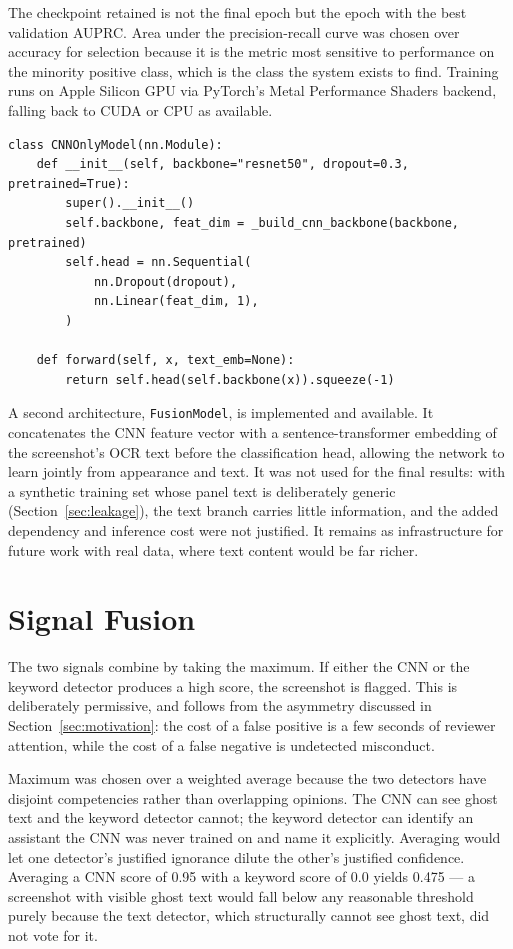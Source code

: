 \documentclass[12pt,oneside]{report}
\newcommand{\code}[1]{\texttt{\small #1}}
\begin{document}
The checkpoint retained is not the final epoch but the epoch with the best
validation AUPRC. Area under the precision-recall curve was chosen over
accuracy for selection because it is the metric most sensitive to performance
on the minority positive class, which is the class the system exists to find.
Training runs on Apple Silicon GPU via PyTorch's Metal Performance Shaders
backend, falling back to CUDA or CPU as available.

\begin{lstlisting}[caption={Model construction. \code{use\_ocr} selects between the CNN-only and fusion architectures.}]
class CNNOnlyModel(nn.Module):
    def __init__(self, backbone="resnet50", dropout=0.3, pretrained=True):
        super().__init__()
        self.backbone, feat_dim = _build_cnn_backbone(backbone, pretrained)
        self.head = nn.Sequential(
            nn.Dropout(dropout),
            nn.Linear(feat_dim, 1),
        )

    def forward(self, x, text_emb=None):
        return self.head(self.backbone(x)).squeeze(-1)
\end{lstlisting}

A second architecture, \code{FusionModel}, is implemented and available. It
concatenates the CNN feature vector with a sentence-transformer embedding of
the screenshot's OCR text before the classification head, allowing the network
to learn jointly from appearance and text. It was not used for the final
results: with a synthetic training set whose panel text is deliberately generic
(Section~\ref{sec:leakage}), the text branch carries little information, and the
added dependency and inference cost were not justified. It remains as
infrastructure for future work with real data, where text content would be far
richer.

\section{Signal Fusion}
\label{sec:fusion}

The two signals combine by taking the maximum. If either the CNN or the keyword
detector produces a high score, the screenshot is flagged. This is deliberately
permissive, and follows from the asymmetry discussed in
Section~\ref{sec:motivation}: the cost of a false positive is a few seconds of
reviewer attention, while the cost of a false negative is undetected
misconduct.

Maximum was chosen over a weighted average because the two detectors have
disjoint competencies rather than overlapping opinions. The CNN can see ghost
text and the keyword detector cannot; the keyword detector can identify an
assistant the CNN was never trained on and name it explicitly. Averaging would
let one detector's justified ignorance dilute the other's justified confidence.
Averaging a CNN score of 0.95 with a keyword score of 0.0 yields 0.475 --- a
screenshot with visible ghost text would fall below any reasonable threshold
purely because the text detector, which structurally cannot see ghost text,
did not vote for it.
\end{document}
